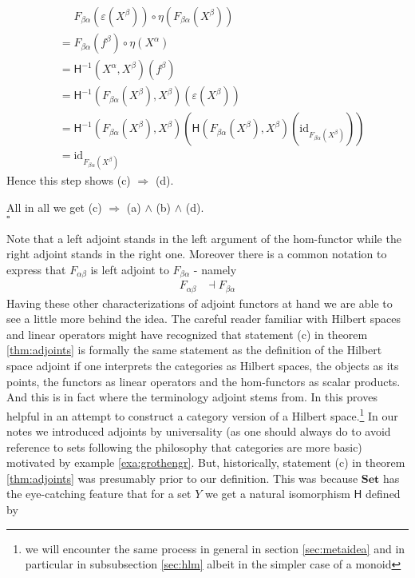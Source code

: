 \begin{prf}
\begin{description}
\begin{align*}
  &\phantom{=}
  F_{\beta\alpha}
  \left(
    \varepsilon(X^{\beta})
  \right)
  \circ
  \eta
  \left(
    F_{\beta\alpha}(X^{\beta})
  \right)
  \\
  &=
  F_{\beta\alpha}(f^{\beta})
  \circ
  \eta(X^{\alpha})
  \\
  &=
  \mathsf{H}^{-1}(X^{\alpha},X^{\beta})(f^{\beta})
  \\
  &=
  \mathsf{H}^{-1}
  \left(
    F_{\beta\alpha}(X^{\beta}),
    X^{\beta}
  \right)
  \left(
    \varepsilon(X^{\beta})
  \right)
  \\
  &=
  \mathsf{H}^{-1}
  \left(
    F_{\beta\alpha}(X^{\beta}),
    X^{\beta}
  \right)
  \left(
    \mathsf{H}
    \left(
      F_{\beta\alpha}(X^{\beta}),
      X^{\beta}
    \right)
    \left(
      \mathrm{id}_{F_{\beta\alpha}(X^{\beta})}
    \right)
  \right)
  \\
  &=
  \mathrm{id}_{F_{\beta\alpha}(X^{\beta})}
\end{align*}
Hence this step shows {\glqq}(c) $\Rightarrow$ (d){\grqq}.
\end{description}
All in all we get {\glqq}(c) $\Rightarrow$ (a) $\land$ (b) $\land$ (d){\grqq}.
\\
\phantom{proven}
\hfill
$\square$
\end{prf}
Note that a left adjoint stands in the left argument of the hom-functor while the right adjoint stands in the right one. Moreover there is a common notation to express that $F_{\alpha\beta}$ is left adjoint to $F_{\beta\alpha}$ - namely
\begin{align*}
  F_{\alpha\beta}
  &\dashv
  F_{\beta\alpha}
\end{align*}
Having these other characterizations of adjoint functors at hand we are able to see a little more behind the idea. The careful reader familiar with Hilbert spaces and linear operators might have recognized that statement (c) in theorem \ref{thm:adjoints} is formally the same statement as the definition of the Hilbert space adjoint if one interprets the categories as Hilbert spaces, the objects as its points, the functors as linear operators and the hom-functors as scalar products. And this is in fact where the terminology {\glqq}adjoint{\grqq} stems from. In \cite{2148248a} this proves helpful in an attempt to construct a category version of a Hilbert space.\footnote{we will encounter the same process in general in section \ref{sec:metaidea} and in particular in subsubsection \ref{sec:hlm} albeit in the simpler case of a monoid} In our notes we introduced adjoints by universality (as one should always do to avoid reference to sets following the philosophy that categories are more basic) motivated by example \ref{exa:grothengr}. But, historically, statement (c) in theorem \ref{thm:adjoints} was presumably prior to our definition. This was because $\mathbf{Set}$ has the eye-catching feature that for a set $Y$ we get a natural isomorphism $\mathsf{H}$ defined by
